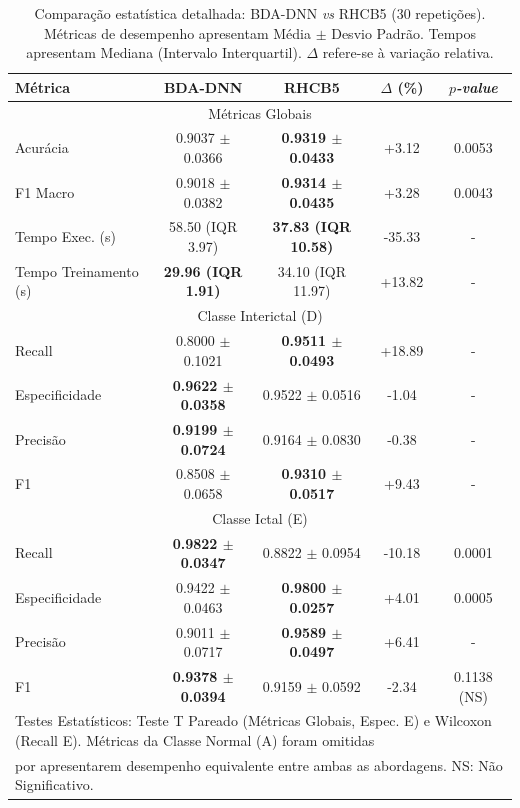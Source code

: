 \documentclass[alpha-refs,brazilian]{CC-EC_TF-TC}
\begin{document}
\begin{table}[ht]
\centering
\caption{Comparação estatística detalhada: BDA-DNN \textit{vs} RHCB5 (30 repetições). Métricas de desempenho apresentam Média $\pm$ Desvio Padrão. Tempos apresentam Mediana (Intervalo Interquartil). $\Delta$ refere-se à variação relativa.}
\label{tab:comparacao_completa}
\begin{tabular}{lcccc}
\hline
Métrica & BDA-DNN & RHCB5 & $\Delta$ (\%) & \textit{$p$-value} \\
\hline
\multicolumn{5}{c}{Métricas Globais} \\
Acurácia              & 0.9037 $\pm$ 0.0366       & \textbf{0.9319 $\pm$ 0.0433} & +3.12  & 0.0053 \\
F1 Macro              & 0.9018 $\pm$ 0.0382       & \textbf{0.9314 $\pm$ 0.0435} & +3.28  & 0.0043 \\
Tempo Exec. (s)       & 58.50 (IQR 3.97)          & \textbf{37.83 (IQR 10.58)}   & -35.33 & - \\
Tempo Treinamento (s) & \textbf{29.96 (IQR 1.91)} & 34.10 (IQR 11.97)            & +13.82 & - \\
\hline
\multicolumn{5}{c}{Classe Interictal (D)} \\
Recall & 0.8000 $\pm$ 0.1021 & \textbf{0.9511 $\pm$ 0.0493} & +18.89 & - \\
Especificidade & \textbf{0.9622 $\pm$ 0.0358} & 0.9522 $\pm$ 0.0516 & -1.04 & - \\
Precisão & \textbf{0.9199 $\pm$ 0.0724} & 0.9164 $\pm$ 0.0830 & -0.38 & - \\
F1 & 0.8508 $\pm$ 0.0658 & \textbf{0.9310 $\pm$ 0.0517} & +9.43 & - \\
\hline
\multicolumn{5}{c}{Classe Ictal (E)} \\
Recall & \textbf{0.9822 $\pm$ 0.0347} & 0.8822 $\pm$ 0.0954 & -10.18 & 0.0001 \\
Especificidade & 0.9422 $\pm$ 0.0463 & \textbf{0.9800 $\pm$ 0.0257} & +4.01 & 0.0005 \\
Precisão & 0.9011 $\pm$ 0.0717 & \textbf{0.9589 $\pm$ 0.0497} & +6.41 & - \\
F1 & \textbf{0.9378 $\pm$ 0.0394} & 0.9159 $\pm$ 0.0592 & -2.34 & 0.1138 (NS) \\
\hline
\multicolumn{5}{l}{\footnotesize Testes Estatísticos: Teste T Pareado (Métricas Globais, Espec. E) e Wilcoxon (Recall E). Métricas da Classe Normal (A) foram omitidas} \\
\multicolumn{5}{l}{\footnotesize por apresentarem desempenho equivalente entre ambas as abordagens. NS: Não Significativo.}
\end{tabular}
\end{table}
\end{document}
